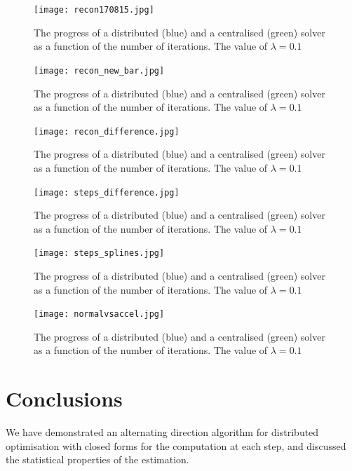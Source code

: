 \begin{figure}[h]
\centering
\texttt{[image: recon170815.jpg]}
\caption{The progress of a distributed (blue) and a centralised (green) solver as a function of the number of iterations. The value of \(\lambda = 0.1\)}
\label{fig:wavelet_recon}
\end{figure}

\begin{figure}[h]
\centering
\texttt{[image: recon\_new\_bar.jpg]}
\caption{The progress of a distributed (blue) and a centralised (green) solver as a function of the number of iterations. The value of \(\lambda = 0.1\)}
\label{fig:wavelet_recon_no_pwer_2}
\end{figure}

\begin{figure}[h]
\centering
\texttt{[image: recon\_difference.jpg]}
\caption{The progress of a distributed (blue) and a centralised (green) solver as a function of the number of iterations. The value of \(\lambda = 0.1\)}
\label{fig:erroriterations}
\end{figure}

\begin{figure}[h]
\centering
\texttt{[image: steps\_difference.jpg]}
\caption{The progress of a distributed (blue) and a centralised (green) solver as a function of the number of iterations. The value of \(\lambda = 0.1\)}
\label{fig:steps_difference}
\end{figure}

\begin{figure}[h]
\centering
\texttt{[image: steps\_splines.jpg]}
\caption{The progress of a distributed (blue) and a centralised (green) solver as a function of the number of iterations. The value of \(\lambda = 0.1\)}
\label{fig:steps_splines}
\end{figure}

\begin{figure}[h]
\centering
\texttt{[image: normalvsaccel.jpg]}
\caption{The progress of a distributed (blue) and a centralised (green) solver as a function of the number of iterations. The value of \(\lambda = 0.1\)}
\label{fig:steps_splines}
\end{figure}

\section{Conclusions}
We have demonstrated an alternating direction algorithm for distributed optimisation with closed forms for the computation at each step, and discussed the statistical properties of the estimation. 


